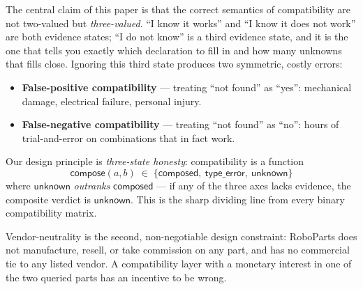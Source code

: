 \documentclass[11pt,twocolumn]{article}
\begin{document}
The central claim of this paper is that the correct semantics of
compatibility are not two-valued but \emph{three-valued}. ``I know
it works'' and ``I know it does not work'' are both evidence states;
``I do not know'' is a third evidence state, and it is the one that
tells you exactly which declaration to fill in and how many unknowns
that fills close. Ignoring this third state produces two symmetric,
costly errors:

\begin{itemize}[nosep,leftmargin=*]
\item \textbf{False-positive compatibility} — treating ``not found''
as ``yes'': mechanical damage, electrical failure, personal injury.
\item \textbf{False-negative compatibility} — treating ``not found''
as ``no'': hours of trial-and-error on combinations that in fact
work.
\end{itemize}

Our design principle is \emph{three-state honesty}: compatibility
is a function
\begin{equation}
  \mathsf{compose}(a, b) \;\in\;
  \{\mathsf{composed},\ \mathsf{type\_error},\ \mathsf{unknown}\}
  \label{eq:trivalue}
\end{equation}
where $\mathsf{unknown}$ \emph{outranks} $\mathsf{composed}$ — if
any of the three axes lacks evidence, the composite verdict is
$\mathsf{unknown}$. This is the sharp dividing line from every binary
compatibility matrix.

Vendor-neutrality is the second, non-negotiable design constraint:
RoboParts does not manufacture, resell, or take commission on any
part, and has no commercial tie to any listed vendor. A compatibility
layer with a monetary interest in one of the two queried parts has
an incentive to be wrong.
\end{document}
